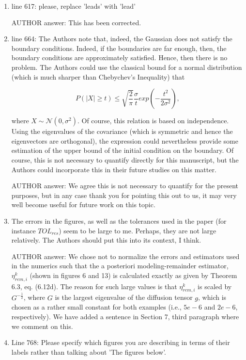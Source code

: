 \documentclass[a4paper,11pt]{scrartcl}
\begin{document}
\begin{enumerate}
\item
line 617: please, replace 'leads' with 'lead'

AUTHOR answer: This has been corrected.

\item
line 664: The Authors note that, indeed, the Gaussian does not satisfy the boundary conditions. Indeed, if the boundaries are far enough, then, the boundary conditions are approximately satisfied. Hence, then there is no problem. The Authors could use the classical bound for a normal distribution (which is much sharper than Chebychev's Inequality) that

$$P(|X| \ge t ) \le \sqrt{\frac{2}{\pi}} \frac{\sigma}{t} exp(-\frac{t^2}{2 \sigma^2}),$$

where $X \sim \mathcal{N}(0,\sigma^2)$. Of course, this relation is based on independence. Using the eigenvalues of the covariance (which is symmetric and hence the eigenvectors are orthogonal), the expression could nevertheless provide some estimation of the upper bound of the initial condition on the boundary.
Of course, this is not necessary to quantify directly for this manuscript, but the Authors could incorporate this in their future studies on this matter.

AUTHOR answer: We agree this is not necessary to quantify for the present purposes, but in any case thank you for pointing this out to us, it may very well become useful for future work on this topic.

\item
The errors in the figures, as well as the tolerances used in the paper (for instance $TOL_{res}$) seem to be large to me. Perhaps, they are not large relatively. The Authors should put this into its context, I think.

AUTHOR answer: We chose not to normalize the errors and estimators used in the numerics such that the a posteriori modeling-remainder estimator, $\eta_{rem,i}^k$ (shown in figures 6 and 13) is calculated exactly as given by Theorem 6.3, eq. (6.12d). The reason for such large values is that $\eta_{rem,i}^k$ is scaled by $G^{-\frac{1}{2}}$, where $G$ is the largest eigenvalue of the diffusion tensor $g$, which is chosen as a rather small constant for both examples (i.e., $5e-6$ and $2e-6$, respectively). We have added a sentence in Section 7, third paragraph where we comment on this.

\item
Line 768: Please specify which figures you are describing in terms of their labels rather than talking about 'The figures below'.


\end{enumerate}
\end{document}
